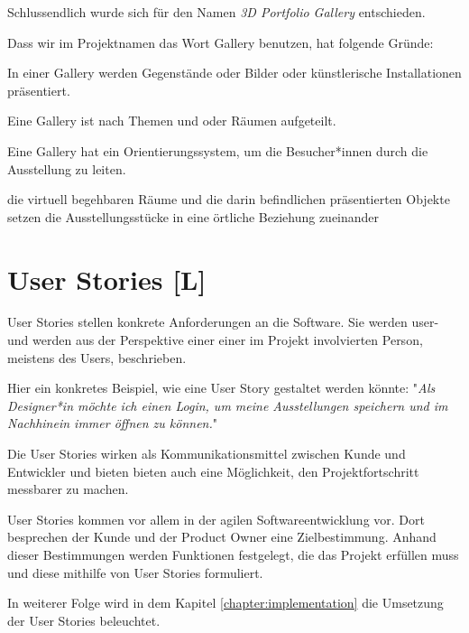 Schlussendlich wurde sich für den Namen \emph{3D Portfolio Gallery} entschieden.

Dass wir im Projektnamen das Wort Gallery benutzen, hat folgende Gründe: 
\begin{compactitem}
    \item In einer Gallery werden Gegenstände oder Bilder oder künstlerische Installationen präsentiert.
    \item Eine Gallery ist nach Themen und oder Räumen aufgeteilt.
    \item Eine Gallery hat ein Orientierungssystem, um die Besucher*innen durch die Ausstellung zu leiten.
    \item die virtuell begehbaren Räume und die darin befindlichen präsentierten Objekte setzen die Ausstellungsstücke in eine örtliche Beziehung zueinander
\end{compactitem}



\section{User Stories [L]}
\label{ch:user-stories}
User Stories stellen konkrete Anforderungen an die Software. Sie werden user- und werden aus der Perspektive einer einer im Projekt involvierten Person, meistens des Users, beschrieben. \cite{AgileVorgehensmodelle}
 
Hier ein konkretes Beispiel, wie eine User Story gestaltet werden könnte: 
"\emph{Als Designer*in möchte ich einen Login, um meine Ausstellungen speichern und im Nachhinein immer öffnen zu können.}"

Die User Stories wirken als Kommunikationsmittel zwischen Kunde und Entwickler und bieten bieten auch eine Möglichkeit, den Projektfortschritt messbarer zu machen. \cite{AgileVorgehensmodelle}

User Stories kommen vor allem in der agilen Softwareentwicklung vor. Dort besprechen der Kunde und der Product Owner eine Zielbestimmung. Anhand dieser Bestimmungen werden Funktionen festgelegt, die das Projekt erfüllen muss und diese mithilfe von User Stories formuliert. \cite{AgileVorgehensmodelle}

In weiterer Folge wird in dem Kapitel \ref{chapter:implementation} die Umsetzung der User Stories beleuchtet.





